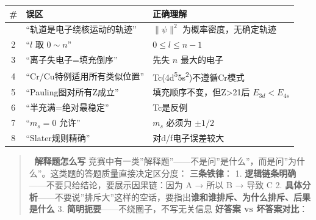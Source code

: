 \documentclass[a4paper,11pt]{ctexart}
\newcounter{none}
\begin{document}
{\def\LTcaptype{none} %
\begin{longtable}[]{@{}cll@{}}
\toprule\noalign{}
\# & 误区 & 正确理解 \\
\midrule\noalign{}
\endhead
\bottomrule\noalign{}
\endlastfoot
1 & ``轨道是电子绕核运动的轨迹'' & \(\|\psi\|^2\) 为概率密度，无确定轨迹 \\
2 & ``\(l\) 取 \(0 \sim n\)'' & \(0 \leq l \leq n-1\) \\
3 & ``离子失电子=填充倒序'' & 先失 \(n\) 最大的电子 \\
4 & ``Cr/Cu特例适用所有类似位置'' & Tc(4d\textsuperscript{5}5s\textsuperscript{2})不遵循Cr模式 \\
5 & ``Pauling图对所有Z成立'' & 填充顺序不变，但Z\textgreater21后 \(E_{3d}<E_{4s}\) \\
6 & ``半充满=绝对最稳定'' & Tc是反例 \\
7 & ``\(m_s=0\) 允许'' & \(m_s\) 必须为 \(\pm1/2\) \\
8 & ``Slater规则精确'' & 对d/f电子误差较大 \\
\end{longtable}
}

\begin{quote}
📝 \textbf{解释题怎么写}
竞赛中有一类''解释题''------不是问''是什么''，而是问''为什么''。这类题的答题质量直接决定区分度：
\textbf{三条铁律}：
1. \textbf{逻辑链条明确}------不要只给结论，要展示因果链：因为 A → 所以 B → 导致 C
2. \textbf{具体分析}------不要说''排斥大''这样的空话，要指出\textbf{谁和谁排斥、为什么排斥、后果是什么}
3. \textbf{简明扼要}------不绕圈子，不写无关信息
\textbf{好答案 vs 坏答案对比}：
\end{quote}
\end{document}
